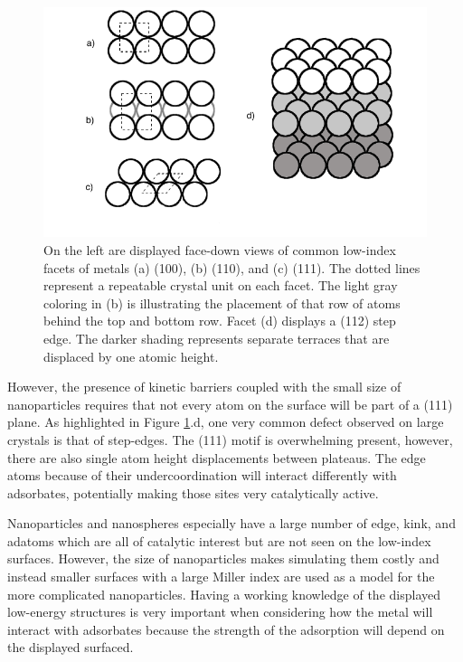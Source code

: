\begin{figure}[p!]
  \includegraphics[width=\linewidth]{../figures/chap1/facets.pdf}
  \caption{On the left are displayed face-down views of common low-index facets
of metals (a) (100), (b) (110), and (c) (111). The dotted lines represent a
repeatable crystal unit on each facet. The light gray coloring in (b) is
illustrating the placement of that row of atoms behind the top and bottom row.
Facet (d) displays a (112) step edge. The darker shading represents separate
terraces that are displaced by one atomic height.}
\label{fig:facets}
\end{figure}

However, the presence of kinetic barriers coupled with the small size of
nanoparticles requires that not every atom on the surface will be part of a
(111) plane. As highlighted in Figure \ref{fig:facets}.d, one very common
defect observed on large crystals is that of step-edges. The (111) motif is
overwhelming present, however, there are also single atom height displacements
between plateaus. The edge atoms because of their undercoordination will
interact differently with adsorbates, potentially making those sites very
catalytically active. 

Nanoparticles and nanospheres especially have a large number of edge, kink, and
adatoms which are all of catalytic interest but are not seen on the low-index
surfaces.  However, the size of nanoparticles makes simulating them costly and
instead smaller surfaces with a large Miller index are used as a model for the
more complicated nanoparticles. Having a working knowledge of the displayed
low-energy structures is very important when considering how the metal will
interact with adsorbates because the strength of the adsorption will depend on
the displayed surfaced.


